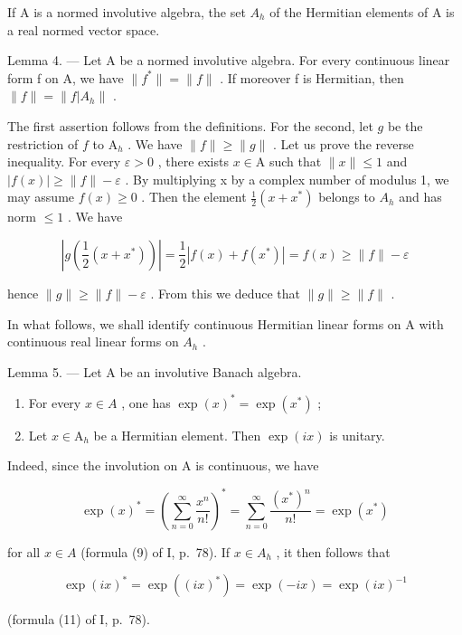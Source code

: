 If A is a normed involutive algebra, the set \(A_{h}\) of the Hermitian elements of A is a real normed vector space.

Lemma 4. --- Let A be a normed involutive algebra. For every continuous linear form f on A, we have \(\|f^{*}\|=\|f\|\) . If moreover f is Hermitian, then \(\|f\|=\|f|A_{h}\|\) .

The first assertion follows from the definitions. For the second, let \(g\) be the restriction of \(f\) to \(\mathrm{A}_h\) . We have \(\| f \| \geqslant \| g \|\) . Let us prove the reverse inequality. For every \(\varepsilon > 0\) , there exists \(x \in \mathrm{A}\) such that \(\| x \| \leqslant 1\) and \(|f(x)| \geqslant \|f\| - \varepsilon\) . By multiplying x by a complex number of modulus 1, we may assume \(f(x) \geqslant 0\) . Then the element \(\frac{1}{2}(x + x^{*})\) belongs to \(A_{h}\) and has norm \(\leqslant 1\) . We have

\[
\left| g \left(\frac {1}{2} (x + x ^ {*})\right) \right| = \frac {1}{2} | f (x) + f (x ^ {*}) | = f (x) \geqslant \| f \| - \varepsilon
\]

hence \(\|g\|\geqslant\|f\|-\varepsilon\) . From this we deduce that \(\|g\|\geqslant\|f\|\) .

In what follows, we shall identify continuous Hermitian linear forms on A with continuous real linear forms on \(A_{h}\) .

Lemma 5. --- Let A be an involutive Banach algebra.

\begin{enumerate}
\def\labelenumi{\alph{enumi})}
\item
  For every \(x \in A\) , one has \(\exp(x)^{*} = \exp(x^{*})\) ;
\item
  Let \(x \in \mathrm{A}_h\) be a Hermitian element. Then \(\exp(ix)\) is unitary.
\end{enumerate}

Indeed, since the involution on A is continuous, we have

\[
\exp (x) ^ {*} = \left(\sum_ {n = 0} ^ {\infty} \frac {x ^ {n}}{n !}\right) ^ {*} = \sum_ {n = 0} ^ {\infty} \frac {(x ^ {*}) ^ {n}}{n !} = \exp (x ^ {*})
\]

for all \(x \in A\) (formula (9) of I, p.~78). If \(x \in A_{h}\) , it then follows that

\[
\exp (i x) ^ {*} = \exp ((i x) ^ {*}) = \exp (- i x) = \exp (i x) ^ {- 1}
\]

(formula (11) of I, p.~78).

